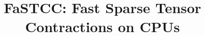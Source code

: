 \documentclass[sigconf, screen, review]{acmart}
\begin{document}
\title{FaSTCC: Fast Sparse Tensor Contractions on CPUs}
%
\maketitle




%
%
%
%
%
%
%



\end{document}
